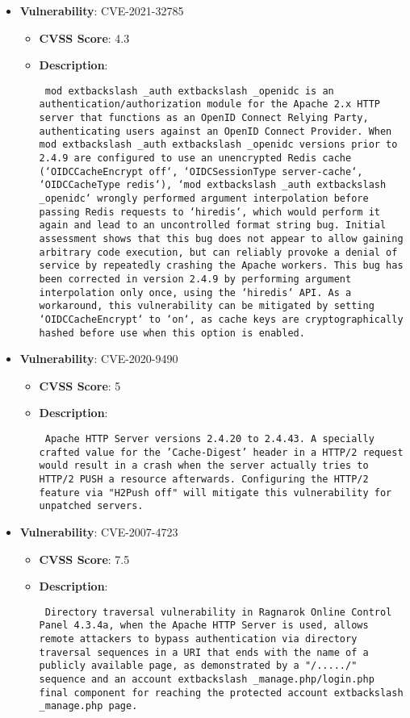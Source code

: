 \documentclass{article}
\begin{document}
\begin{itemize}
        \item \textbf{Vulnerability}: CVE-2021-32785
        \begin{itemize}
            \item \textbf{CVSS Score}:  4.3 
            \item \textbf{Description}: \parbox{\linewidth}{\texttt{ mod	extbackslash _auth	extbackslash _openidc is an authentication/authorization module for the Apache 2.x HTTP server that functions as an OpenID Connect Relying Party, authenticating users against an OpenID Connect Provider. When mod	extbackslash _auth	extbackslash _openidc versions prior to 2.4.9 are configured to use an unencrypted Redis cache (`OIDCCacheEncrypt off`, `OIDCSessionType server-cache`, `OIDCCacheType redis`), `mod	extbackslash _auth	extbackslash _openidc` wrongly performed argument interpolation before passing Redis requests to `hiredis`, which would perform it again and lead to an uncontrolled format string bug. Initial assessment shows that this bug does not appear to allow gaining arbitrary code execution, but can reliably provoke a denial of service by repeatedly crashing the Apache workers. This bug has been corrected in version 2.4.9 by performing argument interpolation only once, using the `hiredis` API. As a workaround, this vulnerability can be mitigated by setting `OIDCCacheEncrypt` to `on`, as cache keys are cryptographically hashed before use when this option is enabled. }}
        \end{itemize}
    
        \item \textbf{Vulnerability}: CVE-2020-9490
        \begin{itemize}
            \item \textbf{CVSS Score}:  5 
            \item \textbf{Description}: \parbox{\linewidth}{\texttt{ Apache HTTP Server versions 2.4.20 to 2.4.43. A specially crafted value for the 'Cache-Digest' header in a HTTP/2 request would result in a crash when the server actually tries to HTTP/2 PUSH a resource afterwards. Configuring the HTTP/2 feature via "H2Push off" will mitigate this vulnerability for unpatched servers. }}
        \end{itemize}
    
        \item \textbf{Vulnerability}: CVE-2007-4723
        \begin{itemize}
            \item \textbf{CVSS Score}:  7.5 
            \item \textbf{Description}: \parbox{\linewidth}{\texttt{ Directory traversal vulnerability in Ragnarok Online Control Panel 4.3.4a, when the Apache HTTP Server is used, allows remote attackers to bypass authentication via directory traversal sequences in a URI that ends with the name of a publicly available page, as demonstrated by a "/...../" sequence and an account	extbackslash _manage.php/login.php final component for reaching the protected account	extbackslash _manage.php page. }}
        \end{itemize}
    

\end{itemize}
\end{document}
